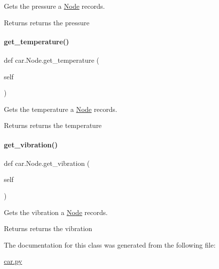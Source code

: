 Gets the pressure a \mbox{\hyperlink{classcar_1_1_node}{Node}} records. 

\begin{DoxyReturn}{Returns}
returns the pressure 
\end{DoxyReturn}
\mbox{\label{classcar_1_1_node_addde3848b6b6695e89a322077195a88d}} 
\paragraph{\texorpdfstring{get\_temperature()}{get\_temperature()}}
{\footnotesize\ttfamily def car.\+Node.\+get\+\_\+temperature (\begin{DoxyParamCaption}\item[{}]{self }\end{DoxyParamCaption})}



Gets the temperature a \mbox{\hyperlink{classcar_1_1_node}{Node}} records. 

\begin{DoxyReturn}{Returns}
returns the temperature 
\end{DoxyReturn}
\mbox{\label{classcar_1_1_node_ae0668fd6f1f82198ed72bf23dc8de2c5}} 
\paragraph{\texorpdfstring{get\_vibration()}{get\_vibration()}}
{\footnotesize\ttfamily def car.\+Node.\+get\+\_\+vibration (\begin{DoxyParamCaption}\item[{}]{self }\end{DoxyParamCaption})}



Gets the vibration a \mbox{\hyperlink{classcar_1_1_node}{Node}} records. 

\begin{DoxyReturn}{Returns}
returns the vibration 
\end{DoxyReturn}


The documentation for this class was generated from the following file\+:\begin{DoxyCompactItemize}
\item 
\mbox{\hyperlink{car_8py}{car.\+py}}\end{DoxyCompactItemize}
